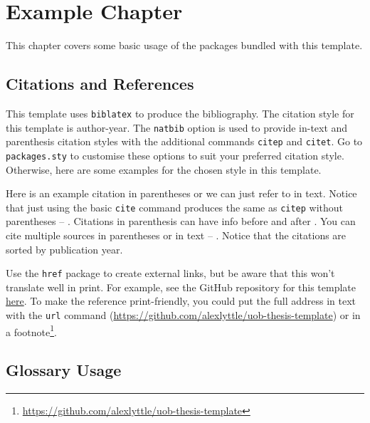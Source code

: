 %
%
%
%
%
\chapter{Example Chapter}

This chapter covers some basic usage of the packages bundled with this template.

\section{Citations and References}

This template uses \texttt{biblatex} to produce the bibliography. The citation style for this template is author-year. The \texttt{natbib} option is used to provide in-text and parenthesis citation styles with the additional commands \texttt{citep} and \texttt{citet}. Go to \texttt{packages.sty} to customise these options to suit your preferred citation style. Otherwise, here are some examples for the chosen style in this template. 

Here is an example citation in parentheses \citep{einstein} or we can just refer to \citet{einstein} in text. Notice that just using the basic \texttt{cite} command produces the same as \texttt{citep} without parentheses -- \cite{knuth-fa}. Citations in parenthesis can have info before and after \citep[e.g.][chap. 2]{dirac}. You can cite multiple sources in parentheses \citep{einstein,knuth-fa,dirac} or in text -- \citet{einstein,dirac,knuth-fa}. Notice that the citations are sorted by publication year.

Use the \texttt{href} package to create external links, but be aware that this won't translate well in print. For example, see the GitHub repository for this template \href{https://github.com/alexlyttle/uob-thesis-template}{here}. To make the reference print-friendly, you could put the full address in text with the \texttt{url} command (\url{https://github.com/alexlyttle/uob-thesis-template}) or in a footnote\footnote{\url{https://github.com/alexlyttle/uob-thesis-template}}.

\section{Glossary Usage}

